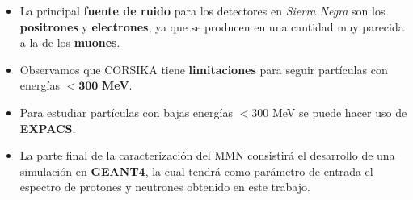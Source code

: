     \begin{frame}{} %
        \justifying %
        \vspace*{-1.5cm} %

        \begin{columns}
            \begin{column}{1.0\textwidth} %
                \begin{itemize}
                    \item La principal \textbf{fuente de ruido} para los detectores en \emph{Sierra Negra} son los \textbf{positrones} y \textbf{electrones}, ya que se producen en una cantidad muy parecida a la de los \textbf{muones}.
                    \item Observamos que CORSIKA tiene \textbf{limitaciones} para seguir partículas con energías $\bm{<} \mathbf{300}$ \textbf{MeV}.
                    \item Para estudiar partículas con bajas energías $<300$ MeV se puede hacer uso de \textbf{EXPACS}.
                    \item La parte final de la caracterización del MMN consistirá el desarrollo de una simulación en \textbf{GEANT4}, la cual tendrá como parámetro de
entrada el espectro de protones y neutrones obtenido en este trabajo.
                \end{itemize}
            \end{column}
        \end{columns}         
    \end{frame}